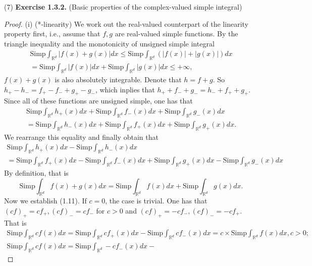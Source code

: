 \documentclass[a4paper]{article}
\begin{document}
(7) {\bfseries Exercise 1.3.2.} (Basic properties of the complex-valued simple integral)\begin{proof}
(i) (*-linearity) We work out the real-valued counterpart of the linearity property first, i.e., assume that $f, g$
are real-valued simple functions.
By the triangle inequality and the monotonicity of unsigned simple integral\begin{multline*}
    \mathrm{Simp}\int_{\mathbb{R}^d} |f(x) + g(x)| dx \leq \mathrm{Simp}\int_{\mathbb{R}^d} (|f(x)| + |g(x)|) dx \\
    = \mathrm{Simp}\int_{\mathbb{R}^d} |f(x)| dx + \mathrm{Simp}\int_{\mathbb{R}^d} |g(x)| dx \leq +\infty,
\end{multline*}
$f(x) + g(x)$ is also absolutely integrable. Denote that $h = f + g$. So $h_+ - h_- = f_+ - f_- + g_+ -  g_-$, which 
inplies that $h_+ + f_- + g_- = h_- + f_+ + g_+$. Since all of these functions are unsigned simple, one has that \begin{multline*}
    \mathrm{Simp}\int_{\mathbb{R}^d} h_+(x) dx + \mathrm{Simp}\int_{\mathbb{R}^d} f_-(x) dx + \mathrm{Simp}\int_{\mathbb{R}^d}g_-(x) dx\\
    = \mathrm{Simp}\int_{\mathbb{R}^d} h_-(x) dx + \mathrm{Simp}\int_{\mathbb{R}^d} f_+(x) dx +  \mathrm{Simp}\int_{\mathbb{R}^d} g_+(x) dx.
\end{multline*}
We rearrange this equality and finally obtain that \begin{multline*}
    \mathrm{Simp}\int_{\mathbb{R}^d} h_+(x) dx - \mathrm{Simp}\int_{\mathbb{R}^d} h_-(x) dx \\
    = \mathrm{Simp}\int_{\mathbb{R}^d}  f_+(x) dx - \mathrm{Simp}\int_{\mathbb{R}^d} f_-(x) dx + 
    \mathrm{Simp}\int_{\mathbb{R}^d} g_+(x) dx - \mathrm{Simp}\int_{\mathbb{R}^d} g_-(x) dx
\end{multline*}
By definition, that is$$
\mathrm{Simp}\int_{\mathbb{R}^d} f(x) + g(x) dx = \mathrm{Simp}\int_{\mathbb{R}^d} f(x) dx + 
\mathrm{Simp}\int_{\mathbb{R}^d} g(x) dx.
$$
Now we establish (1.11). If $c = 0$, the case is trivial. One has that $(cf)_+ = cf_+, (cf)_- = cf_-$ for $c > 0$
and $(cf)_+ = -cf_-, (cf)_- = -cf_+$. That is \begin{gather*}
    \mathrm{Simp}\int_{\mathbb{R}^d} cf(x)dx = \mathrm{Simp}\int_{\mathbb{R}^d} cf_+(x)dx - 
    \mathrm{Simp}\int_{\mathbb{R}^d} cf_-(x)dx = c \times \mathrm{Simp}\int_{\mathbb{R}^d} f(x) dx, c > 0;\\
    \mathrm{Simp}\int_{\mathbb{R}^d} cf(x)dx = \mathrm{Simp}\int_{\mathbb{R}^d} -cf_-(x)dx - 

\end{gather*}
\end{proof}
\end{document}
